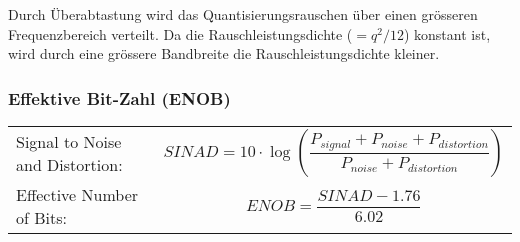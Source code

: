   Durch Überabtastung wird das Quantisierungsrauschen über einen grösseren Frequenzbereich verteilt.
  Da die Rauschleistungsdichte ($=q^2/12$) konstant ist, wird durch eine grössere Bandbreite die
  Rauschleistungsdichte kleiner.
  
\subsubsection{Effektive Bit-Zahl (ENOB)}
  \begin{tabular}{lp{8cm}}
    Signal to Noise and Distortion: &
    \[SINAD = 10 \cdot \log \left(\dfrac{P_{signal}+P_{noise}+P_{distortion}}{P_{noise}+P_{distortion}}\right)\] \\
    Effective Number of Bits: &
    \[ENOB = \dfrac{SINAD-1.76}{6.02}\]
  \end{tabular}

  
  


